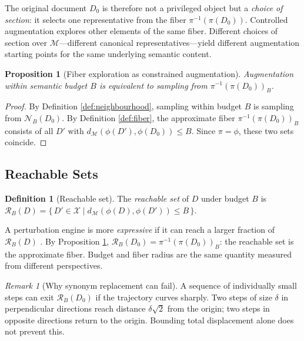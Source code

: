 \documentclass[12pt, a4paper]{article}
\theoremstyle{plain}
\newtheorem{proposition}[theorem]{Proposition}
\theoremstyle{definition}
\newtheorem{definition}[theorem]{Definition}
\theoremstyle{remark}
\newtheorem{remark}[theorem]{Remark}
\newcommand{\calX}{\mathcal{X}}
\newcommand{\calM}{\mathcal{M}}
\newcommand{\calR}{\mathcal{R}}
\newcommand{\vpi}{\pi}
\newcommand{\dM}{d_{\calM}}
\newcommand{\fiber}[1]{\vpi^{-1}(#1)}
\begin{document}
The original document $D_0$ is therefore not a privileged object but a
\emph{choice of section}: it selects one representative from the fiber
$\fiber{\vpi(D_0)}$.  Controlled augmentation explores other elements of
the same fiber.  Different choices of section over $\calM$---different
canonical representatives---yield different augmentation starting points
for the same underlying semantic content.

\begin{proposition}[Fiber exploration as constrained augmentation]
\label{prop:fiber}
Augmentation within semantic budget $B$ is equivalent to sampling from
$\fiber{\vpi(D_0)}_B$.
\end{proposition}

\begin{proof}
By Definition \ref{def:neighbourhood}, sampling within budget $B$ is sampling
from $\mathcal{N}_B(D_0)$.  By Definition \ref{def:fiber}, the approximate fiber
$\fiber{\vpi(D_0)}_B$ consists of all $D'$ with
$\dM(\phi(D'), \phi(D_0)) \le B$.  Since $\vpi = \phi$, these two sets coincide.
\end{proof}

\subsection{Reachable Sets}

\begin{definition}[Reachable set]
\label{def:reachable}
The \emph{reachable set} of $D$ under budget $B$ is
$\calR_B(D) = \{\, D' \in \calX \mid \dM(\phi(D), \phi(D')) \le B\,\}$.
\end{definition}

A perturbation engine is more \emph{expressive} if it can reach a larger
fraction of $\calR_B(D)$ \cite{liberzon2012optimal}.  By Proposition
\ref{prop:fiber}, $\calR_B(D_0) = \fiber{\vpi(D_0)}_B$: the reachable set
is the approximate fiber.  Budget and fiber radius are the same quantity
measured from different perspectives.

\begin{remark}[Why synonym replacement can fail]
A sequence of individually small steps can exit $\calR_B(D_0)$ if the
trajectory curves sharply.  Two steps of size $\delta$ in perpendicular
directions reach distance $\delta\sqrt{2}$ from the origin; two steps in
opposite directions return to the origin.  Bounding total displacement alone
does not prevent this.
\end{remark}
\end{document}
